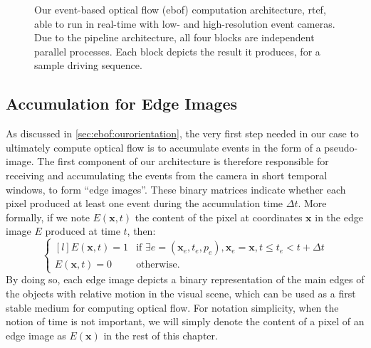 \begin{figure}[t]
  \caption{Our event-based optical flow (\acrshort{ebof}) computation architecture, \acrshort{rtef}, able to run in real-time with low- and high-resolution event cameras. Due to the pipeline architecture, all four blocks are independent parallel processes. Each block depicts the result it produces, for a sample driving sequence.}\label{fig:ebof:architecture}
\end{figure}

\subsection{Accumulation for Edge Images}
As discussed in \cref{sec:ebof:ourorientation}, the very first step needed in our case to ultimately compute optical flow is to accumulate events in the form of a pseudo-image. The first component of our architecture is therefore responsible for receiving and accumulating the events from the camera in short temporal windows, to form ``edge images''. These binary matrices indicate whether each pixel produced at least one event during the accumulation time \(\Delta t\). More formally, if we note \(E(\mathbf{x}, t)\) the content of the pixel at coordinates \(\mathbf{x}\) in the edge image \(E\) produced at time \(t\), then:
\begin{equation}\label{eq:ebof:edge_image}
  \left\{\begin{matrix*}[l]
    E(\mathbf{x}, t) = 1 & \text{if } \exists e=(\mathbf{x}_e, t_e, p_e), \mathbf{x}_e = \mathbf{x}, t \leq t_e < t+\Delta t\\
    E(\mathbf{x}, t) = 0 & \text{otherwise.}
  \end{matrix*}\right.
\end{equation}
By doing so, each edge image depicts a binary representation of the main edges of the objects with relative motion in the visual scene, which can be used as a first stable medium for computing optical flow. For notation simplicity, when the notion of time is not important, we will simply denote the content of a pixel of an edge image as \(E(\mathbf{x})\) in the rest of this chapter.

